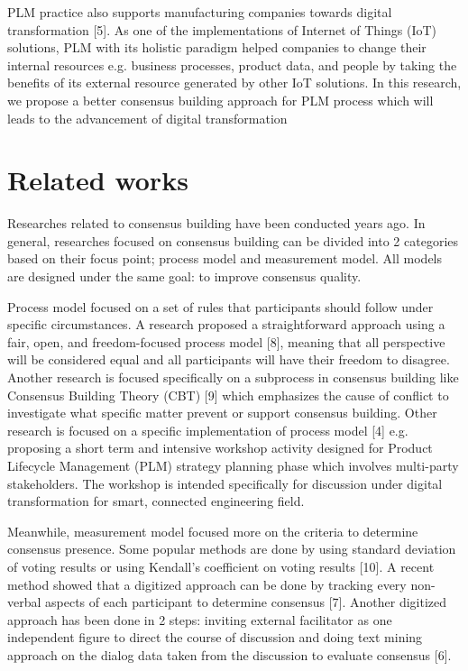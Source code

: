 \documentclass[senior]{IPSstyle}
\begin{document}
PLM practice also supports manufacturing companies towards digital transformation [5]. As one of the implementations of Internet of Things (IoT) solutions, PLM with its holistic paradigm helped companies to change their internal resources e.g. business processes, product data, and people by taking the benefits of its external resource generated by other IoT solutions. In this research, we propose a better consensus building approach for PLM process which will leads to the advancement of digital transformation

\section{Related works}

Researches related to consensus building have been conducted years ago. In general, researches focused on consensus building can be divided into 2 categories based on their focus point; process model and measurement model. All models are designed under the same goal: to improve consensus quality.

Process model focused on a set of rules that participants should follow under specific circumstances. A research proposed a straightforward approach using a fair, open, and freedom-focused process model [8], meaning that all perspective will be considered equal and all participants will have their freedom to disagree. Another research is focused specifically on a subprocess in consensus building like Consensus Building Theory (CBT) [9] which emphasizes the cause of conflict to investigate what specific matter prevent or support consensus building. Other research is focused on a specific implementation of process model [4] e.g. proposing a short term and intensive workshop activity designed for Product Lifecycle Management (PLM) strategy planning phase which involves multi-party stakeholders. The workshop is intended specifically for discussion under digital transformation for smart, connected engineering field.

Meanwhile, measurement model focused more on the criteria to determine consensus presence. Some popular methods are done by using standard deviation of voting results or using Kendall’s coefficient on voting results [10]. A recent method showed that a digitized approach can be done by tracking every non-verbal aspects of each participant to determine consensus [7]. Another digitized approach has been done in 2 steps: inviting external facilitator as one independent figure to direct the course of discussion and doing text mining approach on the dialog data taken from the discussion to evaluate consensus [6].
\end{document}
